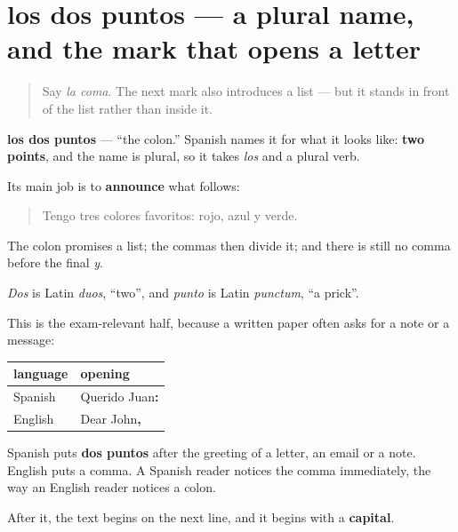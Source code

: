 \section[los dos puntos]{los dos puntos — a plural name, and the mark that opens a letter}

\label{lesson:ES-C424-dos-puntos}



\begin{quote}
Say \emph{la coma}. The next mark also introduces a list — but it stands in front of the list rather than inside it.
\end{quote}

\begin{cousinweb}
\textbf{los dos puntos} — \textquotedblleft{}the colon.\textquotedblright{} Spanish names it for what it looks like: \textbf{two points}, and the name is plural, so it takes \emph{los} and a plural verb.

Its main job is to \textbf{announce} what follows:

\begin{quote}
Tengo tres colores favoritos: rojo, azul y verde.
\end{quote}

The colon promises a list; the commas then divide it; and there is still no comma before the final \emph{y}.

\emph{Dos} is Latin \emph{duos}, \textquotedblleft{}two\textquotedblright{}, and \emph{punto} is Latin \emph{punctum}, \textquotedblleft{}a prick\textquotedblright{}.
\end{cousinweb}

\begin{grammarlens}[title={Grammar Lens: the letter opening, where English disagrees}]
This is the exam-relevant half, because a written paper often asks for a note or a message:

\noindent
\begin{tabularx}{\linewidth}{@{}>{\raggedright\arraybackslash}X>{\raggedright\arraybackslash}X@{}}
\toprule
\textbf{language} & \textbf{opening} \\
\midrule
Spanish & Querido Juan\textbf{:} \\
English & Dear John\textbf{,} \\
\bottomrule
\end{tabularx}

Spanish puts \textbf{dos puntos} after the greeting of a letter, an email or a note. English puts a comma. A Spanish reader notices the comma immediately, the way an English reader notices a colon.

After it, the text begins on the next line, and it begins with a \textbf{capital}.
\end{grammarlens}

